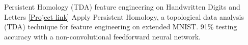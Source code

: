\begin{cventries}
	\cventry
	{}
	{Persistent Homology (TDA) feature engineering on Handwritten Digits and Letters}
	{\href{https://colab.research.google.com/drive/18z161k3diYO6sNVBfiKH8uGqbrekxMPN?usp=sharing}{[Project link]}}
	{}
	{Apply Persistent Homology, a topological data analysis (TDA) technique for feature engineering on extended MNIST. 91\% testing accuracy with a non-convolutional feedforward neural network.}

	\vspace{-10mm}

\end{cventries}